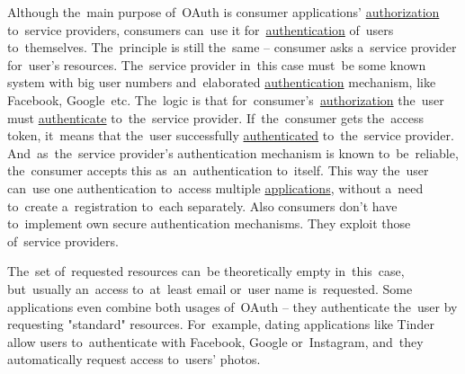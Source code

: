 Although the~main purpose of~OAuth is consumer applications' \hyperref[authenticationauthorization]{authorization} to~service providers, consumers can~use it for~\hyperref[authenticationauthorization]{authentication} of~users to~themselves.
The~principle is still the~same -- consumer asks a~service provider for~user's resources.
The~service provider in~this case must~be some known system with big user numbers and~elaborated \hyperref[authenticationauthorization]{authentication} mechanism, like Facebook, Google~etc.
The~logic is that for~consumer's~\hyperref[authenticationauthorization]{authorization} the~user must \hyperref[authenticationauthorization]{authenticate} to~the~service provider.
If~the~consumer gets the~access token, it~means that the~user successfully \hyperref[authenticationauthorization]{authenticated} to~the~service provider.
And~as~the~service provider's authentication mechanism is known to~be~reliable, the~consumer accepts this as~an~authentication to~itself.
This way the~user can~use one authentication to~access multiple \hyperref[applicationprocessprogramservicethread]{applications}, without a~need to~create a~registration to~each separately.
Also consumers don't have to~implement own secure authentication mechanisms.
They exploit those of~service providers.

The~set of~requested resources can~be theoretically empty in~this~case, but~usually an~access to~at~least email or~user name is~requested.
Some applications even combine both usages of~OAuth -- they authenticate the~user by requesting "standard" resources.
For~example, dating applications like Tinder allow users to~authenticate with Facebook, Google or~Instagram, and~they automatically request access to~users' photos.
